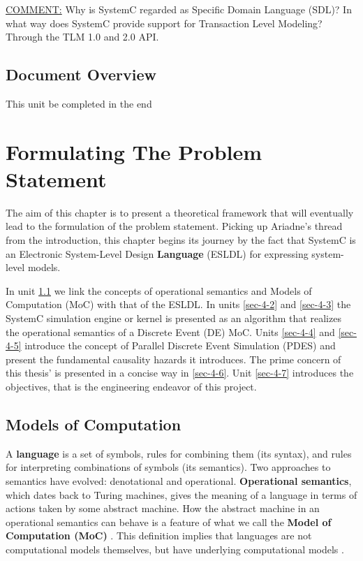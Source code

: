 \documentclass[12pt,twoside]{article}
\begin{document}
\uline{COMMENT:} Why is SystemC regarded as Specific Domain Language (SDL)?
In what way does SystemC provide support for Transaction Level Modeling? Through the TLM 1.0 and 2.0 API.











\subsection{Document Overview}
\label{sec-3-6}
This unit be completed in the end
\clearpage



\section{Formulating The Problem Statement}
\label{sec-4}
The aim of this chapter is to present a theoretical framework that will eventually lead to the formulation of the problem statement.
Picking up Ariadne's thread from the introduction, this chapter begins its journey by the fact that SystemC is an Electronic System-Level Design \textbf{Language} (ESLDL) for expressing system-level models.

In unit \ref{sec-4-1} we link the concepts of operational semantics and Models of Computation (MoC) with that of the ESLDL.
In units \ref{sec-4-2} and \ref{sec-4-3} the SystemC simulation engine or kernel is presented as an algorithm that realizes the operational semantics of a Discrete Event (DE) MoC.
Units \ref{sec-4-4} and \ref{sec-4-5} introduce the concept of Parallel Discrete Event Simulation (PDES) and present the fundamental causality hazards it introduces.
The prime concern of this thesis' is presented in a concise way in \ref{sec-4-6}.
Unit \ref{sec-4-7} introduces the objectives, that is the engineering endeavor of this project.

\subsection{Models of Computation}
\label{sec-4-1}
A \textbf{language} is a set of symbols, rules for combining them (its syntax), and rules for interpreting combinations of symbols (its semantics). 
Two approaches to semantics have evolved: denotational and operational.
\textbf{Operational semantics}, which dates back to Turing machines, gives the meaning of a language in terms of actions taken by some abstract machine. 
How the abstract machine in an operational semantics can behave is a feature of what we call the \textbf{Model of Computation (MoC)} \cite{Edwards1997}.
This definition implies that languages are not computational models themselves, but have underlying computational models \cite{Jantsch2005}.
\end{document}
